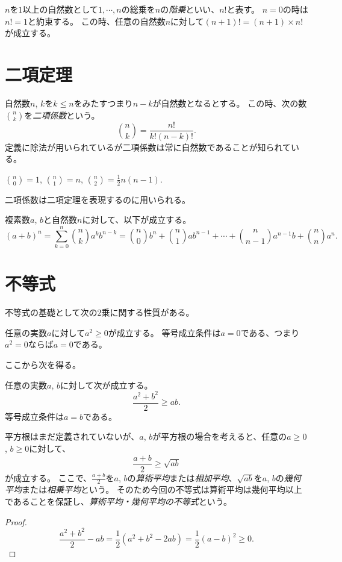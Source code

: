 $n$を$1$以上の自然数として$1, \cdots, n$の総乗を$n$の\emph{階乗}といい、$n!$と表す。
$n = 0$の時は$n! = 1$と約束する。
この時、任意の自然数$n$に対して$(n+1)! = (n+1)\times n!$が成立する。

\section{二項定理}

自然数$n$, $k$を$k \le n$をみたすつまり$n-k$が自然数となるとする。
この時、次の数$\binom{n}{k}$を\emph{二項係数}という。
$$
\binom{n}{k} = \frac{n!}{k!(n-k)!}.
$$
定義に除法が用いられているが二項係数は常に自然数であることが知られている。

\begin{example}
$\binom{n}{0} = 1$, $\binom{n}{1} = n$, $\binom{n}{2} = \frac{1}{2}n(n-1)$.
\end{example}

二項係数は二項定理を表現するのに用いられる。

\begin{proposition}[二項定理]
複素数$a$, $b$と自然数$n$に対して、以下が成立する。
$$
(a+b)^n = \sum_{k = 0}^n \binom{n}{k}a^k b^{n-k} = \binom{n}{0}b^n+\binom{n}{1}a b^{n-1}+\cdots+\binom{n}{n-1}a^{n-1}b+\binom{n}{n}a^n.
$$
\end{proposition}

\section{不等式}

不等式の基礎として次の$2$乗に関する性質がある。

\begin{proposition}
任意の実数$a$に対して$a^2 \ge 0$が成立する。
等号成立条件は$a = 0$である、つまり$a^2 = 0$ならば$a = 0$である。
\end{proposition}

ここから次を得る。

\begin{proposition}
任意の実数$a$, $b$に対して次が成立する。
$$
\frac{a^2+b^2}{2} \ge a b.
$$
等号成立条件は$a = b$である。
\end{proposition}

\begin{remark}
平方根はまだ定義されていないが、$a$, $b$が平方根の場合を考えると、任意の$a \ge 0$, $b \ge 0$に対して、
$$
\frac{a+b}{2} \ge \sqrt{a b}
$$
が成立する。
ここで、$\frac{a+b}{2}$を$a$, $b$の\emph{算術平均}または\emph{相加平均}、$\sqrt{a b}$を$a$, $b$の\emph{幾何平均}または\emph{相乗平均}という。
そのため今回の不等式は算術平均は幾何平均以上であることを保証し、\emph{算術平均・幾何平均の不等式}という。
\end{remark}

\begin{proof}
$$
\frac{a^2+b^2}{2}-a b
= \frac{1}{2}(a^2+b^2-2 a b)
= \frac{1}{2}(a-b)^2 \ge 0.
$$
\end{proof}
